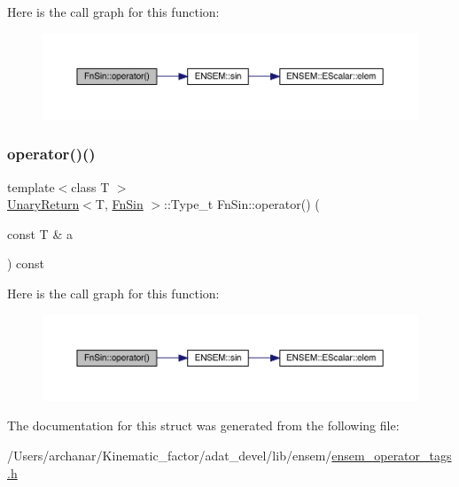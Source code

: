 Here is the call graph for this function\+:
\nopagebreak
\begin{figure}[H]
\begin{center}
\leavevmode
\includegraphics[width=350pt]{d6/d10/structFnSin_a6aa1709fd8bbba5ccb5a3cba4c5ad601_cgraph}
\end{center}
\end{figure}
\mbox{\label{structFnSin_a6aa1709fd8bbba5ccb5a3cba4c5ad601}} 
\subsubsection{\texorpdfstring{operator()()}{operator()()}\hspace{0.1cm}{\footnotesize\ttfamily [2/2]}}
{\footnotesize\ttfamily template$<$class T $>$ \\
\mbox{\hyperlink{structUnaryReturn}{Unary\+Return}}$<$T, \mbox{\hyperlink{structFnSin}{Fn\+Sin}} $>$\+::Type\+\_\+t Fn\+Sin\+::operator() (\begin{DoxyParamCaption}\item[{const T \&}]{a }\end{DoxyParamCaption}) const\hspace{0.3cm}{\ttfamily [inline]}}

Here is the call graph for this function\+:
\nopagebreak
\begin{figure}[H]
\begin{center}
\leavevmode
\includegraphics[width=350pt]{d6/d10/structFnSin_a6aa1709fd8bbba5ccb5a3cba4c5ad601_cgraph}
\end{center}
\end{figure}


The documentation for this struct was generated from the following file\+:\begin{DoxyCompactItemize}
\item 
/\+Users/archanar/\+Kinematic\+\_\+factor/adat\+\_\+devel/lib/ensem/\mbox{\hyperlink{lib_2ensem_2ensem__operator__tags_8h}{ensem\+\_\+operator\+\_\+tags.\+h}}\end{DoxyCompactItemize}
